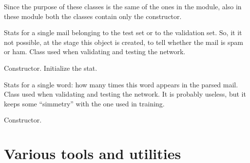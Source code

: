 \documentclass[letterpaper,10pt,english]{sphinxmanual}
\begin{document}
Since the purpose of these classes is the same of the ones in the {\hyperref[index:module-gen_stat]{}} module, also in these module both the classes contain only the constructor.
\label{index:module-test_stat}

\begin{fulllineitems}
\label{index:test_stat.Test_stat}
Stats for a single mail belonging to the test set or to
the validation set. So, it it not possible, at the stage this object
is created, to tell whether the mail is spam or ham. Class used when
validating and testing the network.

\begin{fulllineitems}
\label{index:test_stat.Test_stat.__init__}
Constructor. Initialize the stat.

\end{fulllineitems}


\end{fulllineitems}


\begin{fulllineitems}
\label{index:test_stat.Test_word}
Stats for a single word: how many times this word appears in the parsed
mail. Class used when validating and testing the network. It is probably
useless, but it keeps some ``simmetry'' with the one used in training.

\begin{fulllineitems}
\label{index:test_stat.Test_word.__init__}
Constructor.

\end{fulllineitems}


\end{fulllineitems}



\chapter{Various tools and utilities}
\label{index:various-tools-and-utilities}
\end{document}
